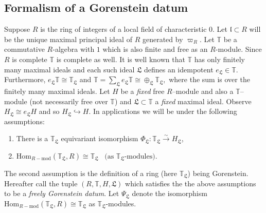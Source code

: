\documentclass[11pt]{amsart}
\begin{document}
\subsection{Formalism of a Gorenstein datum} \label{section: gorenstein-formalism}
Suppose $R$ is the ring of integers of a local field of characteristic $0.$ Let
$\mathfrak{l} \subset R$ will be the unique maximal principal ideal of $R$ generated by $\varpi_R.$
Let $\mathbb{T}$ be a commutative $R$-algebra with $1$ which is also finite and free as an $R$-module. Since $R$ is complete 
$\mathbb{T}$ is complete as well. It is well known that $\mathbb{T} $ has only finitely many maximal ideals and each such ideal 
$\mathfrak{L}$ defines an idempotent $e_\mathfrak{L} \in \mathbb{T}.$ Furthermore, $e_\mathfrak{L}\mathbb{T} \cong \mathbb{T}_\mathfrak{L}$ and 
$\mathbb{T} = \sum_{\mathfrak{L}} e_\mathfrak{L} \mathbb{T} \cong \oplus_{\mathfrak{L}} \mathbb{T}_\mathfrak{L},$ where the sum is over the finitely many maximal ideals. 
Let $H$ be a \textit{fixed} free $R$--module and also a $\mathbb{T}$--module (not necessarily free over $\mathbb{T}$) and $\mathfrak{L} \subset \mathbb{T}$ a \textit{fixed} maximal ideal. 
Observe $H_\mathfrak{L} \cong e_\mathfrak{L} H$ and so $H_\mathfrak{L} \hookrightarrow H.$
In applications we will be under the following assumptions:
	\begin{enumerate}
		\item  There is a $\mathbb{T}_\mathfrak{L}$ equivariant isomorphism $\Phi_\mathfrak{L}: \mathbb{T}_\mathfrak{L} \xrightarrow{\sim} H_\mathfrak{L}$,
		\item $\text{Hom}_{R-\text{mod}}\left(\mathbb{T}_\mathfrak{L}, R \right) \cong 
		\mathbb{T}_\mathfrak{L} \;\;\; \text{(as $\mathbb{T}_{\mathfrak{L}}$-modules)}.$ 
	\end{enumerate}
	
The second assumption is the definition of a ring (here $\mathbb{T}_\mathfrak{L}$) being Gorenstein. 
Hereafter call the tuple $(R, \mathbb{T}, H, \mathfrak{L})$ which satisfies the the above assumptions to be a \textit{freely Gorenstein datum}.
Let $\Psi_\mathfrak{L}$ denote the isomorphism $\text{Hom}_{R-\text{mod}}\left(\mathbb{T}_\mathfrak{L}, R \right) \cong \mathbb{T}_\mathfrak{L}$
as $\mathbb{T}_{\mathfrak{L}}$-modules. 
	
\end{document}
